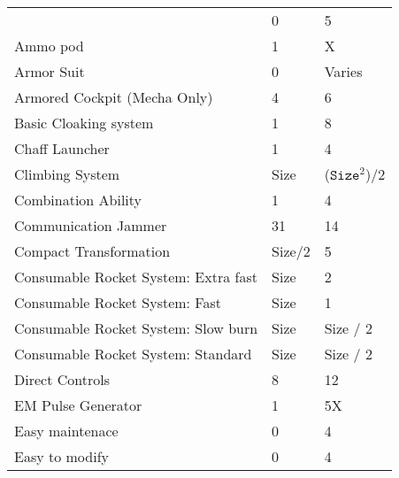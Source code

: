 \documentclass[twoside]{book}
\begin{document}
\begin{longtable}{p{1.25in}ll}
  &
   0 
  &
   5 
  \tabularnewline
      
  \raggedright
           Ammo pod 
  &
   1 
  &
   X 
  \tabularnewline
      
  \raggedright
           Armor Suit 
  &
   0 
  &
   Varies 
  \tabularnewline
      
  \raggedright
           Armored Cockpit (Mecha Only)
           
  &
   4 
  &
   6 
  \tabularnewline
      
  \raggedright
           Basic Cloaking system 
  &
   1 
  &
   8 
  \tabularnewline
      
  \raggedright
           Chaff Launcher 
  &
   1 
  &
   4 
  \tabularnewline
      
  \raggedright
           Climbing System 
  &
   Size 
  &
   (\begin{math}{\texttt{Size}}^{2}\end{math})/2 
  \tabularnewline
      
  \raggedright
           Combination Ability 
  &
   1 
  &
   4 
  \tabularnewline
      
  \raggedright
           Communication Jammer 
  &
   31 
  &
   14 
  \tabularnewline
      
  \raggedright
           Compact Transformation 
  &
   Size/2 
  &
   5 
  \tabularnewline
      
  \raggedright
           Consumable Rocket System: Extra
           fast 
  &
   Size 
  &
   2 
  \tabularnewline
      
  \raggedright
           Consumable Rocket System: Fast
           
  &
   Size 
  &
   1 
  \tabularnewline
      
  \raggedright
           Consumable Rocket System: Slow
           burn 
  &
   Size 
  &
   Size / 2 
  \tabularnewline
      
  \raggedright
           Consumable Rocket System:
           Standard 
  &
   Size 
  &
   Size / 2 
  \tabularnewline
      
  \raggedright
           Direct Controls 
  &
   8 
  &
   12 
  \tabularnewline
      
  \raggedright
           EM Pulse Generator 
  &
   1 
  &
   5X 
  \tabularnewline
      
  \raggedright
           Easy maintenace 
  &
   0 
  &
   4 
  \tabularnewline
      
  \raggedright
           Easy to modify 
  &
   0 
  &
   4 
  \tabularnewline
      

\end{longtable}
\end{document}
